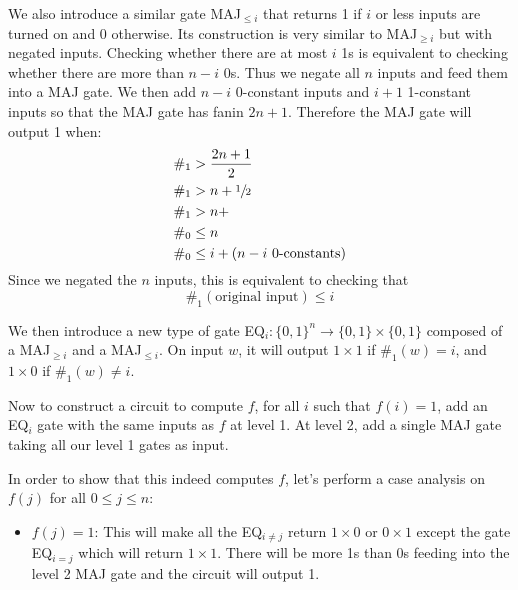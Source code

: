 \documentclass{article}
\begin{document}
\begin{enumerate}

We also introduce a similar gate MAJ$_{\leq i}$ that returns 1 if $i$ or less inputs are turned on and 0 otherwise. Its construction is very similar to MAJ$_{\geq i}$ but with negated inputs. Checking whether there are at most $i$ 1s is equivalent to checking whether there are more than $n-i$ 0s. Thus we negate all $n$ inputs and feed them into a MAJ gate. We then add $n-i$ 0-constant inputs and $i+1$ 1-constant inputs so that the MAJ gate has fanin $2n+1$. Therefore the MAJ gate will output 1 when:
\begin{align*}
\#_1 &> \frac{2n+1}{2} \\
\#_1 &> n + \sfrac{1}{2} \\
\#_1 &> n + \\
\#_0 &\leq n \\ 
\#_0 &\leq i + (n-i \text{ 0-constants})
\end{align*}
Since we negated the $n$ inputs, this is equivalent to checking that $$\#_1(\text{original input}) \leq i$$

We then introduce a new type of gate EQ$_i:\{0,1\}^n\rightarrow\{0,1\}\times\{0,1\}$ composed of a MAJ$_{\geq i}$ and a MAJ$_{\leq i}$. On input $w$, it will output $1 \times 1$ if $\#_1(w)=i$, and $1 \times 0$ if $\#_1(w)\not=i$.

Now to construct a circuit to compute $f$, for all $i$ such that $f(i)=1$, add an EQ$_i$ gate with the same inputs as $f$ at level 1.  At level 2, add a single MAJ gate taking all our level 1 gates as input.

In order to show that this indeed computes $f$, let's perform a case analysis on $f(j)$ for all $0\leq j \leq n$:
\begin{itemize}
\item $f(j)=1$: This will make all the EQ$_{i\not=j}$ return $1 \times 0$ or $0 \times 1$ except the gate EQ$_{i=j}$ which will return $1 \times 1$. There will be more 1s than 0s feeding into the level 2 MAJ gate and the circuit will output 1.


\end{itemize}
\end{enumerate}
\end{document}
